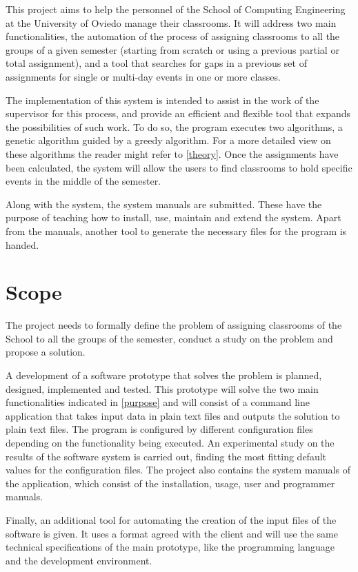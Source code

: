 This project aims to help the personnel of the School of Computing Engineering at the University of Oviedo manage their classrooms. It will address two main functionalities, the automation of the process of assigning classrooms to all the groups of a given semester (starting from scratch or using a previous partial or total assignment), and a tool that searches for gaps in a previous set of assignments for single or multi-day events in one or more classes.

The implementation of this system is intended to assist in the work of the supervisor for this process, and provide an efficient and flexible tool that expands the possibilities of such work. To do so, the program executes two algorithms, a genetic algorithm guided by a greedy algorithm. For a more detailed view on these algorithms the reader might refer to \ref{theory}. Once the assignments have been calculated, the system will allow the users to find classrooms to hold specific events in the middle of the semester.

Along with the system, the system manuals are submitted. These have the purpose of teaching how to install, use, maintain and extend the system. Apart from the manuals, another tool to generate the necessary files for the program is handed.


\section{Scope}

The project needs to formally define the problem of assigning classrooms of the School to all the groups of the semester, conduct a study on the problem and propose a solution. 

A development of a software prototype that solves the problem is planned, designed, implemented and tested. This prototype will solve the two main functionalities indicated in \ref{purpose} and will consist of a command line application that takes input data in plain text files and outputs the solution to plain text files. The program is configured by different configuration files depending on the functionality being executed. An experimental study on the results of the software system is carried out, finding the most fitting default values for the configuration files. The project also contains the system manuals of the application, which consist of the installation, usage, user and programmer manuals. 

Finally, an additional tool for automating the creation of the input files of the software is given. It uses a format agreed with the client and will use the same technical specifications of the main prototype, like the programming language and the development environment.


